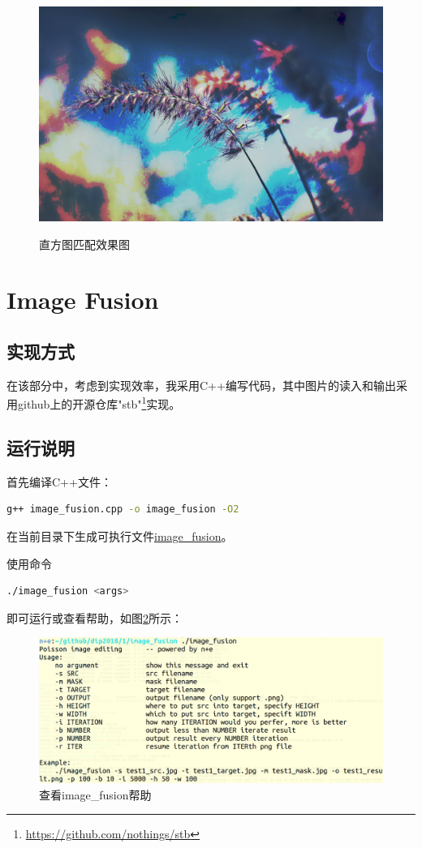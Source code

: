 \documentclass[a4paper]{article}
\begin{document}
\begin{figure}[htp]
{\begin{minipage}[b]{0.6\columnwidth}
{\includegraphics[width=1\columnwidth]{1_9.png}
}
\label{fig:1-6:b}
\end{minipage}
}
\caption{直方图匹配效果图}
\label{fig:1-6}
\end{figure}

\section{Image Fusion}
\subsection{实现方式}

在该部分中，考虑到实现效率，我采用C++编写代码，其中图片的读入和输出采用github上的开源仓库"stb"\footnote{\url{https://github.com/nothings/stb}}实现。

\subsection{运行说明}
首先编译C++文件：
\begin{lstlisting}[language=bash]
g++ image_fusion.cpp -o image_fusion -O2
\end{lstlisting}
在当前目录下生成可执行文件\underline{image\_fusion}。

使用命令
\begin{lstlisting}[language=bash]
./image_fusion <args>
\end{lstlisting}
即可运行或查看帮助，如图\ref{fig:2-1}所示：
\begin{figure}[htp]
\centering
\includegraphics[width=1\linewidth]{2_1.png}
\caption{查看image\_fusion帮助}
\label{fig:2-1}
\end{figure}
\end{document}

